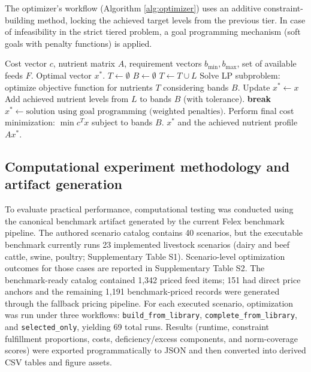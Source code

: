 \documentclass[a4paper,fleqn]{cas-sc}
\begin{document}
The optimizer's workflow (Algorithm \ref{alg:optimizer}) uses an additive constraint-building method, locking the achieved target levels from the previous tier. In case of infeasibility in the strict tiered problem, a goal programming mechanism (soft goals with penalty functions) is applied.

\begin{algorithm}[htbp]
\caption{Additive Hierarchical Ration Optimization Algorithm (Diet Engine)}\label{alg:optimizer}
\begin{algorithmic}[1]
\Require Cost vector $c$, nutrient matrix $A$, requirement vectors $b_{\min}, b_{\max}$, set of available feeds $F$.
\Ensure Optimal vector $x^*$.
\State $T \gets \emptyset$ 
\State $B \gets \emptyset$ 
    \State $T \gets T \cup L$
    \State Solve LP subproblem: optimize objective function for nutrients $T$ considering bands $B$.
        \State Update $x^* \gets x$
        \State Add achieved nutrient levels from $L$ to bands $B$ (with tolerance).
    \Else
        \State \textbf{break}
    \EndIf
\EndFor
{}
    \State $x^* \gets \text{solution using goal programming (weighted penalties)}$.
\Else
    \State Perform final cost minimization: $\min c^T x$ subject to bands $B$.
\EndIf
\State \Return $x^*$ and the achieved nutrient profile $A x^*$.
\end{algorithmic}
\end{algorithm}

\subsection{Computational experiment methodology and artifact generation}\label{subsec:experiment}

To evaluate practical performance, computational testing was conducted using the canonical benchmark artifact generated by the current Felex benchmark pipeline. The authored scenario catalog contains 40 scenarios, but the executable benchmark currently runs 23 implemented livestock scenarios (dairy and beef cattle, swine, poultry; Supplementary Table S1). Scenario-level optimization outcomes for those cases are reported in Supplementary Table S2. The benchmark-ready catalog contained 1,342 priced feed items; 151 had direct price anchors and the remaining 1,191 benchmark-priced records were generated through the fallback pricing pipeline. For each executed scenario, optimization was run under three workflows: \texttt{build\_from\_library}, \texttt{complete\_from\_library}, and \texttt{selected\_only}, yielding 69 total runs. Results (runtime, constraint fulfillment proportions, costs, deficiency/excess components, and norm-coverage scores) were exported programmatically to JSON and then converted into derived CSV tables and figure assets.
\end{document}
